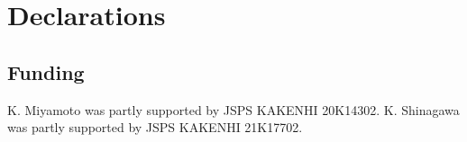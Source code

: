 \documentclass[tikz]{amsart}
\theoremstyle{definition}
\theoremstyle{remark}
\begin{document}



\section*{Declarations}

\subsection*{Funding}
K. Miyamoto was partly supported by JSPS KAKENHI 20K14302. 
K. Shinagawa was partly supported by JSPS KAKENHI 21K17702. 
\end{document}
